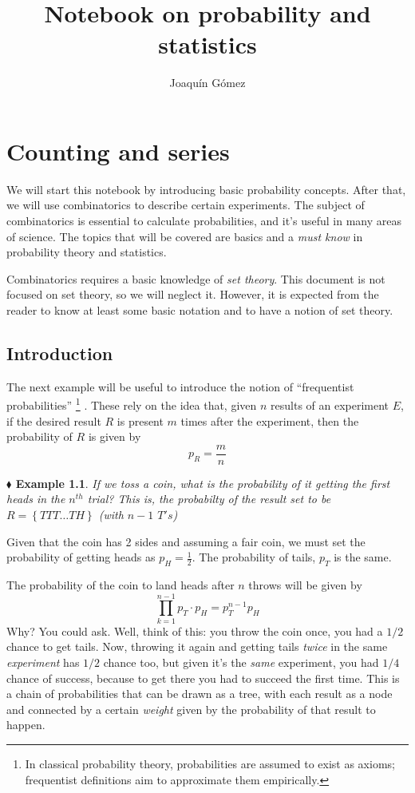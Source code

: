 \documentclass{report}
\title{Notebook on probability and statistics}
\author{Joaquín Gómez}
\date{}
\newcommand*{\daggerfootnote}[1]{%
  \begingroup
  \renewcommand*{\thefootnote}{\fnsymbol{footnote}}%
  \footnote{#1}%
  \endgroup
}
\newtheorem{example}{$\blacklozenge$ Example}[chapter]
\begin{document}
\maketitle
\chapter{Counting and series}
We will start this notebook by introducing basic probability concepts.
After that, we will use combinatorics to describe certain experiments.
The subject of combinatorics is essential to calculate probabilities,
and it's useful in many areas of science.
The topics that will be covered are basics and a \textit{must know} in
probability theory and statistics.

Combinatorics requires a basic knowledge of \textit{set theory}. This
document is not focused on set theory, so we will neglect it. However,
it is expected from the reader to know at least some basic notation and
to have a notion of set theory.

\section{Introduction}
The next example will be useful to introduce the notion of ``frequentist probabilities''\daggerfootnote{
    In classical probability theory, probabilities are assumed to exist as axioms; frequentist definitions aim to approximate them empirically.
}. These
rely on the idea that, given $n$ results of an experiment $E$, if the desired result $R$
is present $m$ times after the experiment, then the probability of $R$ is given by
\begin{equation}
    p_R = \frac{m}{n}
\end{equation}

\begin{example}
    If we toss a coin, what is the probability of it getting the first heads in the $n^{th}$ trial?
    This is, the probabilty of the result set to be $R = \left\{T T T \dots T H\right\}$
    (with $n-1$ $T's$)
\end{example}
Given that the coin has 2 sides and assuming a fair coin, we must set the probability of getting
heads as $p_H = \frac{1}{2}$. The probability of tails, $p_T$ is the same.

The probability of the coin to land heads after $n$ throws will be given by
\begin{equation}
    \prod_{k=1}^{n-1}{p_T} \cdot p_H = p_T^{n-1}p_H
\end{equation}
Why? You could ask. Well, think of this: you throw the coin once, you had a $1/2$ chance to get
tails. Now, throwing it again and getting tails \textit{twice} in the same \textit{experiment}
has $1/2$ chance too, but given it's the \textit{same} experiment, you had $1/4$ chance of success,
because to get there you had to succeed the first time. This is a chain of probabilities that
can be drawn as a tree, with each result as a node and connected by a certain \textit{weight} given
by the probability of that result to happen.
\end{document}
